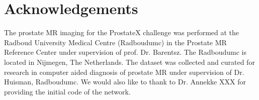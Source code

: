 \documentclass[num-refs]{wiley-article}
\begin{document}
\section{Acknowledgements}
The prostate MR imaging for the ProstateX challenge was performed at the Radboud University Medical Centre (Radboudumc) in the Prostate MR Reference Center under supervision of prof. Dr. Barentsz. The Radboudumc is located in Nijmegen, The Netherlands. The dataset was collected and curated for research in computer aided diagnosis of prostate MR under supervision of Dr. Huisman, Radboudumc. We would also like to thank to Dr. Annekke XXX for providing the initial code of the network.






\end{document}
